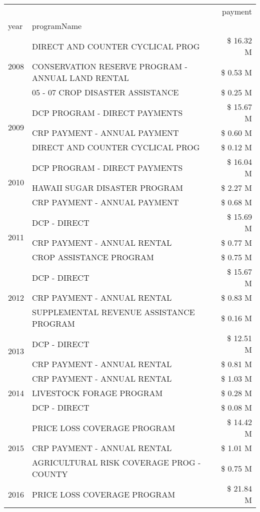 \begin{tabular}{llr}
\toprule
 &  & payment \\
year & programName &  \\
\midrule
\multirow[t]{3}{*}{2008} & DIRECT AND COUNTER CYCLICAL PROG & \$ 16.32 M \\
 & CONSERVATION RESERVE PROGRAM - ANNUAL LAND RENTAL & \$ 0.53 M \\
 & 05 - 07 CROP DISASTER ASSISTANCE & \$ 0.25 M \\
\cline{1-3}
\multirow[t]{3}{*}{2009} & DCP PROGRAM - DIRECT PAYMENTS & \$ 15.67 M \\
 & CRP PAYMENT - ANNUAL PAYMENT & \$ 0.60 M \\
 & DIRECT AND COUNTER CYCLICAL PROG & \$ 0.12 M \\
\cline{1-3}
\multirow[t]{3}{*}{2010} & DCP PROGRAM - DIRECT PAYMENTS & \$ 16.04 M \\
 & HAWAII SUGAR DISASTER PROGRAM & \$ 2.27 M \\
 & CRP PAYMENT - ANNUAL PAYMENT & \$ 0.68 M \\
\cline{1-3}
\multirow[t]{3}{*}{2011} & DCP - DIRECT & \$ 15.69 M \\
 & CRP PAYMENT - ANNUAL RENTAL & \$ 0.77 M \\
 & CROP ASSISTANCE PROGRAM & \$ 0.75 M \\
\cline{1-3}
\multirow[t]{3}{*}{2012} & DCP - DIRECT & \$ 15.67 M \\
 & CRP PAYMENT - ANNUAL RENTAL & \$ 0.83 M \\
 & SUPPLEMENTAL REVENUE ASSISTANCE PROGRAM & \$ 0.16 M \\
\cline{1-3}
\multirow[t]{2}{*}{2013} & DCP - DIRECT & \$ 12.51 M \\
 & CRP PAYMENT - ANNUAL RENTAL & \$ 0.81 M \\
\cline{1-3}
\multirow[t]{3}{*}{2014} & CRP PAYMENT - ANNUAL RENTAL & \$ 1.03 M \\
 & LIVESTOCK FORAGE PROGRAM & \$ 0.28 M \\
 & DCP - DIRECT & \$ 0.08 M \\
\cline{1-3}
\multirow[t]{3}{*}{2015} & PRICE LOSS COVERAGE PROGRAM & \$ 14.42 M \\
 & CRP PAYMENT - ANNUAL RENTAL & \$ 1.01 M \\
 & AGRICULTURAL RISK COVERAGE PROG - COUNTY & \$ 0.75 M \\
\cline{1-3}
\multirow[t]{3}{*}{2016} & PRICE LOSS COVERAGE PROGRAM                   & \$ 21.84 M \\

\end{tabular}
